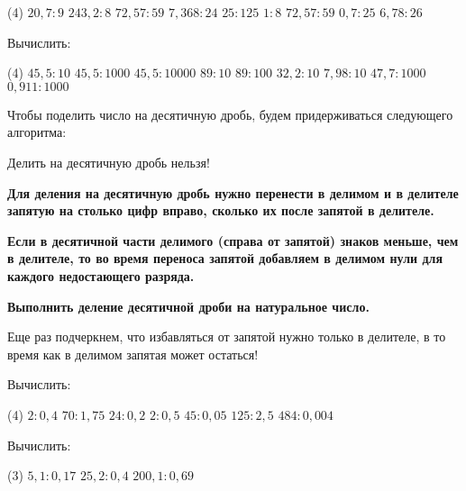 \begin{class}[number=1-2]
\begin{listofex}
		\begin{tasks}(4)
			\task \( 20,7:9 \)
			\task \( 243,2:8 \)
			\task \( 72,57:59 \)
			\task \( 7,368:24 \)
			\task \( 25:125 \)
			\task \( 1:8 \)
			\task \( 72,57:59 \)
			\task \( 0,7:25 \)
			\task \( 6,78:26 \)
		\end{tasks}
		\item Вычислить:
		\begin{tasks}(4)
			\task \( 45,5:10 \)
			\task \( 45,5:1000 \)
			\task \( 45,5:10000 \)
			\task \( 89:10 \)
			\task \( 89:100 \)
			\task \( 32,2:10 \)
			\task \( 7,98:10 \)
			\task \( 47,7:1000 \)
			\task \( 0,911:1000 \)
		\end{tasks}
	\end{listofex}
	\begin{definit}
		Чтобы поделить число на десятичную дробь, будем придерживаться следующего алгоритма:
		\begin{enumcols}[itemcolumns=1]
			\item Делить на десятичную дробь нельзя!
			\item \textbf{Для деления на десятичную дробь нужно перенести в делимом и в
				делителе запятую на столько цифр вправо, сколько их после запятой в
				делителе.}
			\item \textbf{Если в десятичной части делимого (справа от запятой) знаков меньше, чем в делителе, то во время переноса запятой добавляем в делимом нули для каждого недостающего разряда.}
			\item \textbf{Выполнить деление десятичной дроби на натуральное число.}
			\item Еще раз подчеркнем, что избавляться от запятой нужно только в
			делителе, в то время как в делимом запятая может остаться!
		\end{enumcols}
	\end{definit}
	\begin{listofex}[resume]
		\item Вычислить:
		\begin{tasks}(4)
			\task \( 2:0,4 \)
			\task \( 70:1,75 \)
			\task \( 24:0,2 \)
			\task \( 2:0,5 \)
			\task \( 45:0,05 \)
			\task \( 125:2,5 \)
			\task \( 484:0,004 \)
		\end{tasks}
		\item Вычислить:
		\begin{tasks}(3)
			\task \( 5,1:0,17 \)
			\task \( 25,2:0,4 \)
			\task \( 200,1:0,69 \)
		\end{tasks}
	\end{listofex}
\end{class}


